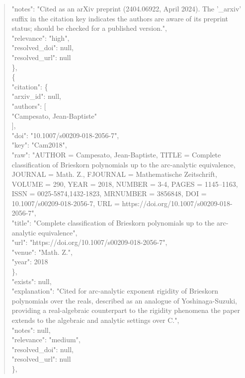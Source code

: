 \documentclass[11pt]{article}
\begin{document}
\begin{quote}
      "notes": "Cited as an arXiv preprint (2404.06922, April 2024). The '\_arxiv' suffix in the citation key indicates the authors are aware of its preprint status; should be checked for a published version.",\\
      "relevance": "high",\\
      "resolved\_doi": null,\\
      "resolved\_url": null\\
    \},\\
    \{\\
      "citation": \{\\
        "arxiv\_id": null,\\
        "authors": [\\
          "Campesato, Jean-Baptiste"\\
        ],\\
        "doi": "10.1007/s00209-018-2056-7",\\
        "key": "Cam2018",\\
        "raw": "AUTHOR = Campesato, Jean-Baptiste, TITLE = Complete classification of Brieskorn polynomials up to the arc-analytic equivalence, JOURNAL = Math. Z., FJOURNAL = Mathematische Zeitschrift, VOLUME = 290, YEAR = 2018, NUMBER = 3-4, PAGES = 1145--1163, ISSN = 0025-5874,1432-1823, MRNUMBER = 3856848, DOI = 10.1007/s00209-018-2056-7, URL = https://doi.org/10.1007/s00209-018-2056-7",\\
        "title": "Complete classification of Brieskorn polynomials up to the arc-analytic equivalence",\\
        "url": "https://doi.org/10.1007/s00209-018-2056-7",\\
        "venue": "Math. Z.",\\
        "year": 2018\\
      \},\\
      "exists": null,\\
      "explanation": "Cited for arc-analytic exponent rigidity of Brieskorn polynomials over the reals, described as an analogue of Yoshinaga-Suzuki, providing a real-algebraic counterpart to the rigidity phenomena the paper extends to the algebraic and analytic settings over C.",\\
      "notes": null,\\
      "relevance": "medium",\\
      "resolved\_doi": null,\\
      "resolved\_url": null\\
    \},\\

\end{quote}
\end{document}
